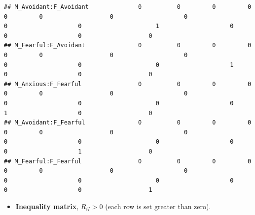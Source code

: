 \documentclass[
]{book}
\providecommand{\tightlist}{%
  \setlength{\itemsep}{0pt}\setlength{\parskip}{0pt}}
\begin{document}
\begin{verbatim}
## M_Avoidant:F_Avoidant              0          0         0         0          0         0                   0                    0                   0                    0                     1                    0                   0                    0                   0
## M_Fearful:F_Avoidant               0          0         0         0          0         0                   0                    0                   0                    0                     0                    1                   0                    0                   0
## M_Anxious:F_Fearful                0          0         0         0          0         0                   0                    0                   0                    0                     0                    0                   1                    0                   0
## M_Avoidant:F_Fearful               0          0         0         0          0         0                   0                    0                   0                    0                     0                    0                   0                    1                   0
## M_Fearful:F_Fearful                0          0         0         0          0         0                   0                    0                   0                    0                     0                    0                   0                    0                   1
\end{verbatim}

\begin{itemize}
\tightlist
\item
  \textbf{Inequality matrix}, \(R_{iI} > 0\) (each row is set greater than zero).
\end{itemize}
\end{document}

